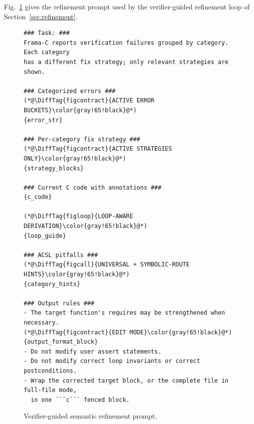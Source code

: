 
Fig.~\ref{fig:prompt-refine} gives the refinement prompt used by the verifier-guided refinement loop of Section~\ref{sec:refinement}.

\begin{figure}[H]
\centering
\begin{tcolorbox}[promptboxcompact, title={Verifier-guided refinement prompt}, width=\columnwidth]
\begin{lstlisting}[style=PromptInnerCompact]
### Task: ###
Frama-C reports verification failures grouped by category. Each category
has a different fix strategy; only relevant strategies are shown.

### Categorized errors ###
(*@\DiffTag{figcontract}{ACTIVE ERROR BUCKETS}\color{gray!65!black}@*)
{error_str}

### Per-category fix strategy ###
(*@\DiffTag{figcontract}{ACTIVE STRATEGIES ONLY}\color{gray!65!black}@*)
{strategy_blocks}

### Current C code with annotations ###
{c_code}

(*@\DiffTag{figloop}{LOOP-AWARE DERIVATION}\color{gray!65!black}@*)
{loop_guide}

### ACSL pitfalls ###
(*@\DiffTag{figcall}{UNIVERSAL + SYMBOLIC-ROUTE HINTS}\color{gray!65!black}@*)
{category_hints}

### Output rules ###
- The target function's requires may be strengthened when necessary.
(*@\DiffTag{figcontract}{EDIT MODE}\color{gray!65!black}@*)
{output_format_block}
- Do not modify user assert statements.
- Do not modify correct loop invariants or correct postconditions.
- Wrap the corrected target block, or the complete file in full-file mode,
  in one ```c``` fenced block.
\end{lstlisting}
\end{tcolorbox}
\caption{Verifier-guided semantic refinement prompt.}
\label{fig:prompt-refine}
\end{figure}
